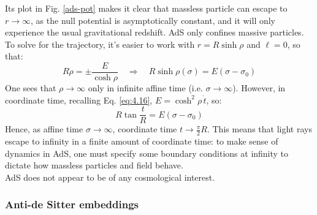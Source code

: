 Its plot in Fig. \ref{ads-pot} makes it clear that massless particle can escape to $ r \rightarrow \infty $, as the null potential is asymptotically constant, and it will only experience the usual gravitational redshift. AdS only confines massive particles.
To solve for the trajectory, it's easier to work with $ r = R \sinh \rho $ and $ \ell = 0 $, so that:
\begin{equation*}
  R \dot{\rho} = \pm \frac{E}{\cosh \rho}
  \quad \Rightarrow \quad
  R \sinh \rho(\sigma) = E (\sigma - \sigma_0)
\end{equation*}
One sees that $ \rho \rightarrow \infty $ only in infinite affine time (i.e. $ \sigma \rightarrow \infty $). However, in coordinate time, recalling Eq. \ref{eq:4.16}, $ E = \cosh^2 \rho\, \dot{t} $, so:
\begin{equation*}
  R \tan \frac{t}{R} = E (\sigma - \sigma_0)
\end{equation*}
Hence, as affine time $ \sigma \rightarrow \infty $, coordinate time $ t \rightarrow \frac{\pi}{2} R $. This means that light rays escape to infinity in a finite amount of coordinate time: to make sense of dynamics in AdS, one must specify some boundary conditions at infinity to dictate how massless particles and field behave.\\
AdS does not appear to be of any cosmological interest.

\subsubsection{Anti-de Sitter embeddings}

